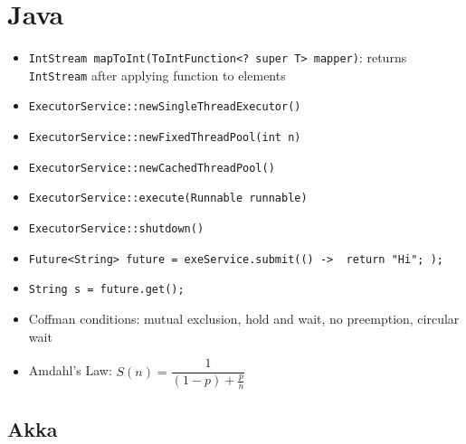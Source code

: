 \documentclass[11pt]{scrartcl}
\begin{document}
\section{Java}

\begin{itemize}
    \item \texttt{IntStream mapToInt(ToIntFunction<? super T> mapper)}: returns 
    \texttt{IntStream} after applying function to elements
    \item \texttt{ExecutorService::newSingleThreadExecutor()}
    \item \texttt{ExecutorService::newFixedThreadPool(int n)}
    \item \texttt{ExecutorService::newCachedThreadPool()}
    \item \texttt{ExecutorService::execute(Runnable runnable)}
    \item \texttt{ExecutorService::shutdown()}
    \item \texttt{Future<String> future = exeService.submit(() -> { return "Hi"; });}
    \item \texttt{String s = future.get();}
    \item Coffman conditions: mutual exclusion, hold and wait, no preemption, circular wait
    \item Amdahl's Law: \( S ( n ) = \dfrac{1}{( 1 - p ) + \frac{p}{n}} \)
\end{itemize}

\subsection{Akka}
\end{document}
